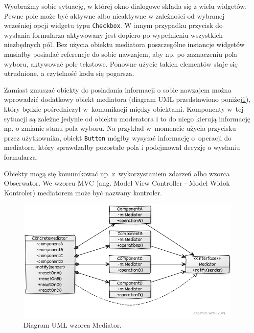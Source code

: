 Wyobraźmy sobie sytuację, w której okno dialogowe składa się z wielu widgetów. Pewne pole może być aktywne albo nieaktywne w zależności od wybranej wcześniej opcji widgetu typu \texttt{Checkbox}. W innym przypadku przycisk do wysłania formularza aktywowany jest dopiero po wypełnieniu wszystkich niezbędnych pól. Bez użycia obiektu mediatora poszczególne instancje widgetów musiałby posiadać referencje do sobie nawzajem, aby np. po zaznaczeniu pola wyboru, aktywować pole tekstowe. Ponowne użycie takich elementów staje się utrudnione, a czytelność kodu się pogarsza.


Zamiast zmuszać obiekty do posiadania informacji o sobie nawzajem można wprowadzić dodatkowy obiekt mediatora (diagram UML przedstawiono poniżej\ref{lab4/fig/MediatorUml}), który będzie pośredniczył w~komunikacji między obiektami. Komponenty w~tej sytuacji są zależne jedynie od obiektu moderatora i to do niego kierują informację np. o zmianie stanu pola wyboru. Na przykład w~momencie użycia przycisku przez użytkownika, obiekt \texttt{Button} mógłby wysyłać informację o~operacji do mediatora, który sprawdzałby pozostałe pola i podejmował decyzję o wysłaniu formularza.


Obiekty mogą się komunikować np. z~wykorzystaniem zdarzeń albo wzorca Obserwator. We wzorcu MVC (ang. Model View Controller - Model Widok Kontroler) mediatorem może być nazwany kontroler.

\begin{figure}[hbt!]
	\centering
	\includegraphics[width=0.9\linewidth]{images/MediatorUml}
	\caption{Diagram UML wzorca Mediator.}
	\label{lab4/fig/MediatorUml}
\end{figure}
%


